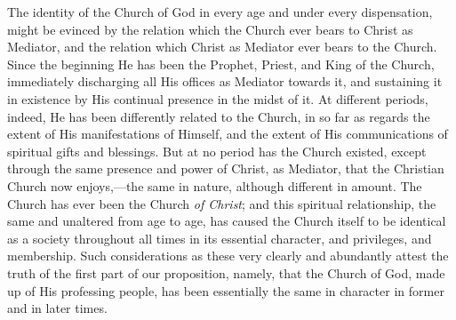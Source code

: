 \documentclass[
]{book}
\begin{document}
\begin{enumerate}
  The identity of the Church of God in every age and under every dispensation, might be evinced by the relation which the Church ever bears to Christ as Mediator, and the relation which Christ as Mediator ever bears to the Church. Since the beginning He has been the Prophet, Priest, and King of the Church, immediately discharging all His offices as Mediator towards it, and sustaining it in existence by His continual presence in the midst of it. At different periods, indeed, He has been differently related to the Church, in so far as regards the extent of His manifestations of Himself, and the extent of His communications of spiritual gifts and blessings. But at no period has the Church existed, except through the same presence and power of Christ, as Mediator, that the Christian Church now enjoys,---the same in nature, although different in amount. The Church has ever been the Church \emph{of Christ}; and this spiritual relationship, the same and unaltered from age to age, has caused the Church itself to be identical as a society throughout all times in its essential character, and privileges, and membership. Such considerations as these very clearly and abundantly attest the truth of the first part of our proposition, namely, that the Church of God, made up of His professing people, has been essentially the same in character in former and in later times.
\end{enumerate}
\end{document}
